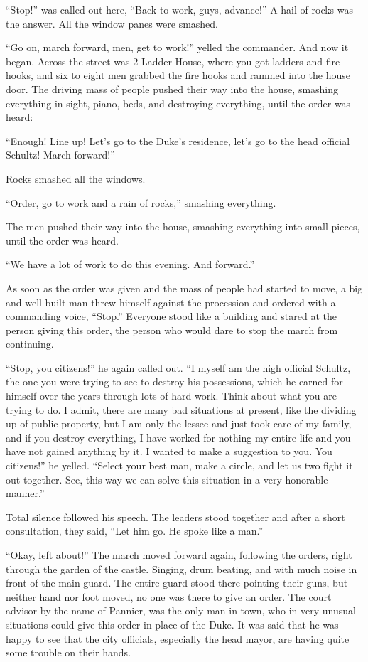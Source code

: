 ``Stop!'' was called out here, ``Back to work, guys, advance!'' A hail of rocks was the answer. All the window panes were smashed.

``Go on, march forward, men, get to work!'' yelled the commander. And now it began. Across the street was 2 Ladder House, where you got ladders and fire hooks, and six to eight men grabbed the fire hooks and rammed into the house door. The driving mass of people pushed their way into the house, smashing everything in sight, piano, beds, and destroying everything, until the order was heard:

``Enough! Line up! Let's go to the Duke's residence, let's go to the head official Schultz! March forward!''

Rocks smashed all the windows.

``Order, go to work and a rain of rocks,'' smashing everything.

The men pushed their way into the house, smashing everything into small pieces, until the order was heard.

``We have a lot of work to do this evening. And forward.''

As soon as the order was given and the mass of people had started to move, a big and well-built man threw himself against the procession and ordered with a commanding voice, ``Stop.'' Everyone stood like a building and stared at the person giving this order, the person who would dare to stop the march from continuing.

``Stop, you citizens!'' he again called out. ``I myself am the high official Schultz, the one you were trying to see to destroy his possessions, which he earned for himself over the years through lots of hard work. Think about what you are trying to do. I admit, there are many bad situations at present, like the dividing up of public property, but I am only the lessee and just took care of my family, and if you destroy everything, I have worked for nothing my entire life and you have not gained anything by it. I wanted to make a suggestion to you. You citizens!'' he yelled. ``Select your best man, make a circle, and let us two fight it out together. See, this way we can solve this situation in a very honorable manner.''

Total silence followed his speech. The leaders stood together and after a short consultation, they said, ``Let him go. He spoke like a man.''

``Okay, left about!'' The march moved forward again, following the orders, right through the garden of the castle. Singing, drum beating, and with much noise in front of the main guard. The entire guard stood there pointing their guns, but neither hand nor foot moved, no one was there to give an order. The court advisor by the name of Pannier, was the only man in town, who in very unusual situations could give this order in place of the Duke. It was said that he was happy to see that the city officials, especially the head mayor, are having quite some trouble on their hands.

